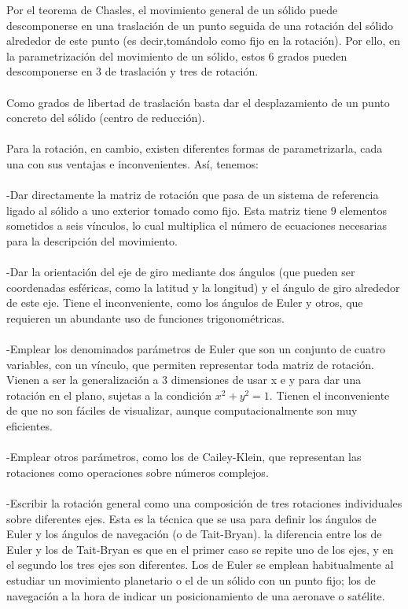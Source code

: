\documentclass[12pt,a4paper]{report}
\begin{document}
Por el teorema de Chasles, el movimiento general de un sólido puede descomponerse en una traslación de un punto seguida de una rotación del sólido alrededor de este punto (es decir,tomándolo como fijo en la rotación). Por ello, en la parametrización del movimiento de un sólido, estos 6 grados pueden descomponerse en 3 de traslación y tres de rotación.\\
\noindent\\
Como grados de libertad de traslación basta dar el desplazamiento de un punto concreto del sólido (centro de reducción).\\
\noindent\\
Para la rotación, en cambio, existen diferentes formas de parametrizarla, cada una con sus ventajas e inconvenientes. Así, tenemos:\\
\noindent\\
-Dar directamente la matriz de rotación que pasa de un sistema de referencia ligado al sólido a uno exterior tomado como fijo. Esta matriz tiene 9 elementos sometidos a seis vínculos, lo cual multiplica el número de ecuaciones necesarias para la descripción del movimiento.\\
\noindent\\
-Dar la orientación del eje de giro mediante dos ángulos (que pueden ser coordenadas esféricas, como la latitud y la longitud) y el ángulo de giro alrededor de este eje. Tiene el inconveniente, como los ángulos de Euler y otros, que requieren un abundante uso de funciones trigonométricas.\\
\noindent\\
-Emplear los denominados parámetros de Euler que son un conjunto de cuatro variables, con un vínculo, que permiten representar toda matriz de rotación. Vienen a ser la generalización a 3 dimensiones de usar x e y para dar una rotación en el plano, sujetas a la condición $x^{2}+y^{2}=1$. Tienen el inconveniente de que no son fáciles de visualizar, aunque computacionalmente son muy eficientes.\\
\noindent\\
-Emplear otros parámetros, como los de Cailey-Klein, que representan las rotaciones como operaciones sobre números complejos.\\
\noindent\\
-Escribir la rotación general como una composición de tres rotaciones individuales sobre diferentes ejes. Esta es la técnica que se usa para definir los ángulos de Euler y los ángulos de navegación (o de Tait-Bryan). la diferencia entre los de Euler y los de Tait-Bryan es que en el primer caso se repite uno de los ejes, y en el segundo los tres ejes son diferentes. Los de Euler se emplean habitualmente al estudiar un movimiento planetario o el de un sólido con un punto fijo; los de navegación a la hora de indicar un posicionamiento de una aeronave o satélite.\\
\end{document}
